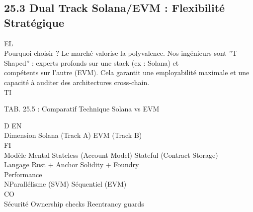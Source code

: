\subsection{25.3 Dual Track Solana/EVM : Flexibilité Stratégique}
\vspace{0.5em}
\vspace{0.5em}
\vspace{0.5em}
\vspace{0.5em}
EL\\
Pourquoi choisir ? Le marché valorise la polyvalence. Nos ingénieurs sont ”T-Shaped” : experts profonds sur une stack (ex : Solana) et\\
compétents sur l’autre (EVM). Cela garantit une employabilité maximale et une capacité à auditer des architectures cross-chain.\\
\vspace{0.5em}
\vspace{0.5em}
\vspace{0.5em}
\vspace{0.5em}
TI\\
\begin{center}\begin{tabular}TAB. 25.5 : Comparatif Technique Solana vs EVM\end{tabular}\end{center}
\vspace{0.5em}
\vspace{0.5em}
\vspace{0.5em}
\vspace{0.5em}
D   EN\\
Dimension     Solana (Track A)          EVM (Track B)\\
\vspace{0.5em}
\vspace{0.5em}
\vspace{0.5em}
\vspace{0.5em}
FI\\
Modèle Mental Stateless (Account Model) Stateful (Contract Storage)\\
Langage       Rust + Anchor             Solidity + Foundry\\
Performance\\
NParallélisme (SVM)        Séquentiel (EVM)\\
CO\\
Sécurité      Ownership checks          Reentrancy guards\\
\vspace{0.5em}
\vspace{0.5em}
\vspace{0.5em}
\vspace{0.5em}
